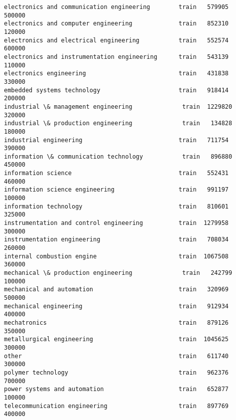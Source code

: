 \documentclass[11pt]{article}
\begin{document}
\begin{tcolorbox}[breakable, size=fbox, boxrule=.5pt, pad at break*=1mm, opacityfill=0]
\begin{Verbatim}[commandchars=\\\{\}]
electronics and communication engineering        train   579905  500000
electronics and computer engineering             train   852310  120000
electronics and electrical engineering           train   552574  600000
electronics and instrumentation engineering      train   543139  110000
electronics engineering                          train   431838  330000
embedded systems technology                      train   918414  200000
industrial \& management engineering              train  1229820  320000
industrial \& production engineering              train   134828  180000
industrial engineering                           train   711754  390000
information \& communication technology           train   896880  450000
information science                              train   552431  460000
information science engineering                  train   991197  100000
information technology                           train   810601  325000
instrumentation and control engineering          train  1279958  300000
instrumentation engineering                      train   708034  260000
internal combustion engine                       train  1067508  360000
mechanical \& production engineering              train   242799  100000
mechanical and automation                        train   320969  500000
mechanical engineering                           train   912934  400000
mechatronics                                     train   879126  350000
metallurgical engineering                        train  1045625  300000
other                                            train   611740  300000
polymer technology                               train   962376  700000
power systems and automation                     train   652877  100000
telecommunication engineering                    train   897769  400000


\end{Verbatim}
\end{tcolorbox}
\end{document}
